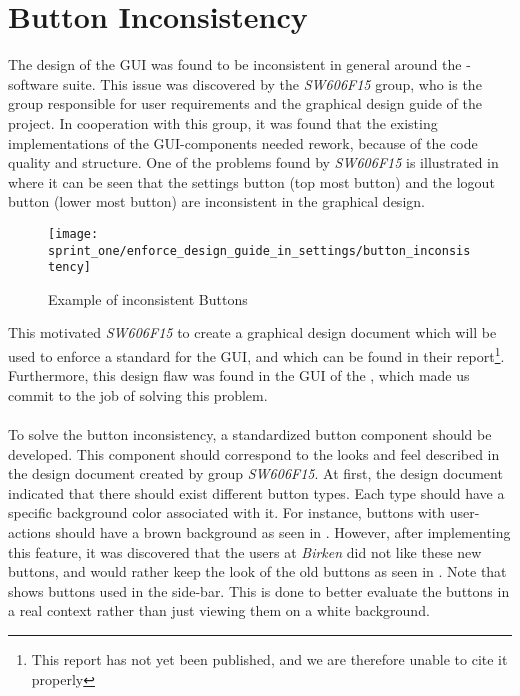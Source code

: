 \section{Button Inconsistency}
\label{sub:button_inconsistency}

The design of the GUI was found to be inconsistent in general around the \giraf-software suite. This issue was discovered by the \emph{SW606F15} group, who is the group responsible for user requirements and the graphical design guide of the project. In cooperation with this group, it was found that the existing implementations of the GUI-components needed rework, because of the code quality and structure.  One of the problems found by \emph{SW606F15} is illustrated in  where it can be seen that the settings button (top most button) and the logout button (lower most button) are inconsistent in the graphical design.

\begin{figure}[!htbp]
    \centering
    \texttt{[image: sprint\_one/enforce\_design\_guide\_in\_settings/button\_inconsistency]}
    \caption{Example of inconsistent Buttons}
    \label{fig:button_inconsistency}
\end{figure}

This motivated \emph{SW606F15} to create a graphical design document which will be used to enforce a standard for the GUI, and which can be found in their report\footnote{This report has not yet been published, and we are therefore unable to cite it properly}. Furthermore, this design flaw was found in the GUI of the \launcher, which made us commit to the job of solving this problem.
\\\\
To solve the button inconsistency, a standardized button component should be developed. This component should correspond to the looks and feel described in the design document created by group \emph{SW606F15}. At first, the design document indicated that there should exist different button types. Each type should have a specific background color associated with it. For instance, buttons with user-actions should have a brown background as seen in . However, after implementing this feature, it was discovered that the users at \emph{Birken} did not like these new buttons, and would rather keep the look of the old buttons as seen in . Note that  shows buttons used in the \launcher side-bar. This is done to better evaluate the buttons in a real context rather than just viewing them on a white background.

